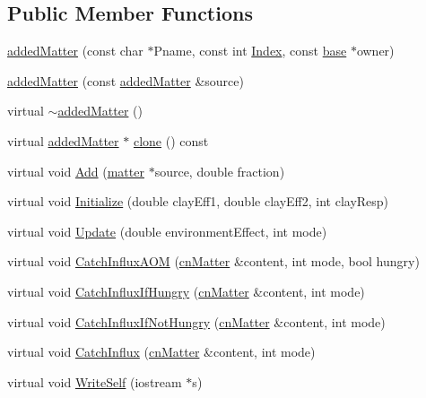 \subsection*{Public Member Functions}
\begin{DoxyCompactItemize}
\item 
\hyperlink{classadded_matter_a97f9f5b16dfdf93ac6f751e755c631f9}{addedMatter} (const char $\ast$Pname, const int \hyperlink{classbase_afa59aaa1a0201700640234eb13a03aae}{Index}, const \hyperlink{classbase}{base} $\ast$owner)
\item 
\hyperlink{classadded_matter_a9d9e11591272b620d65112841fb8502e}{addedMatter} (const \hyperlink{classadded_matter}{addedMatter} \&source)
\item 
virtual \hyperlink{classadded_matter_aa4b1598ba39d28c6e85f0b0a031ac180}{$\sim$addedMatter} ()
\item 
virtual \hyperlink{classadded_matter}{addedMatter} $\ast$ \hyperlink{classadded_matter_ad211e0c8e46f87b030a5101560f0c6a0}{clone} () const 
\item 
virtual void \hyperlink{classadded_matter_a14ebb9ad01566cdc7e48ae871aa719f6}{Add} (\hyperlink{classmatter}{matter} $\ast$source, double fraction)
\item 
virtual void \hyperlink{classadded_matter_a8b9b2332722afe8a6ad0a3b833d095dd}{Initialize} (double clayEff1, double clayEff2, int clayResp)
\item 
virtual void \hyperlink{classadded_matter_af259408e737a8605b710842d67f72ad7}{Update} (double environmentEffect, int mode)
\item 
virtual void \hyperlink{classadded_matter_a6903d04f88ba89f70f48f09f6d3b6526}{CatchInfluxAOM} (\hyperlink{classcn_matter}{cnMatter} \&content, int mode, bool hungry)
\item 
virtual void \hyperlink{classadded_matter_a82ac9bf0ca59c436d6f393467b3bb70a}{CatchInfluxIfHungry} (\hyperlink{classcn_matter}{cnMatter} \&content, int mode)
\item 
virtual void \hyperlink{classadded_matter_a23ebccf4a6eeb768a053a6c8c8190111}{CatchInfluxIfNotHungry} (\hyperlink{classcn_matter}{cnMatter} \&content, int mode)
\item 
virtual void \hyperlink{classadded_matter_a453f802edd746aeb213c26c823678517}{CatchInflux} (\hyperlink{classcn_matter}{cnMatter} \&content, int mode)
\item 
virtual void \hyperlink{classadded_matter_a288683b6f62f782a4cd1706d48dc1c0e}{WriteSelf} (iostream $\ast$s)
\item 

\end{DoxyCompactItemize}

